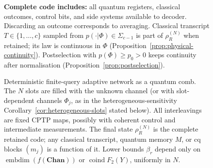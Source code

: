 \documentclass[11pt,a4paper]{article}
\theoremstyle{definition}
\theoremstyle{plain}
\theoremstyle{remark}
\newcommand{\Chan}{\mathbf{Chan}}
\begin{document}
\begin{figure}[t]
\hspace*{-8mm}
\centering
{}
\vspace{2mm}
\begin{minipage}{0.92\linewidth}
\footnotesize
\textbf{Complete code includes:} all quantum registers, classical outcomes, control bits, and side systems available to decoder. Discarding an outcome corresponds to averaging. Classical transcript $T\in\{1,\dots,c\}$ sampled from $p(\cdot|\Phi)\in\Sigma_{c-1}$ is part of $\rho_R^{(N)}$ when retained; its law is continuous in $\Phi$ (Proposition~\ref{prop:physical-continuity}). Postselection with $p(\Phi)\ge p_0>0$ keeps continuity after normalisation (Proposition~\ref{prop:postselection}).
\end{minipage}
\caption{Deterministic finite-query adaptive network as a quantum comb. The $N$ slots are filled with the unknown channel (or with slot-dependent channels $\Phi_j$, as in the heterogeneous-sensitivity Corollary~\ref{cor:heterogeneous-slots} stated below). All interleavings are fixed CPTP maps, possibly with coherent control and intermediate measurements. The final state $\rho_R^{(N)}$ is the complete retained code; any classical transcript, quantum memory $M$, or cq blocks $(m_j)$ is a function of it. Lower bounds $\beta_r$ depend only on $\operatorname{embdim}(f(\Chan))$ or $\operatorname{coind}F_2(Y)$, uniformly in $N$.}
\label{fig:comb-complete-code}
\end{figure}
\end{document}
